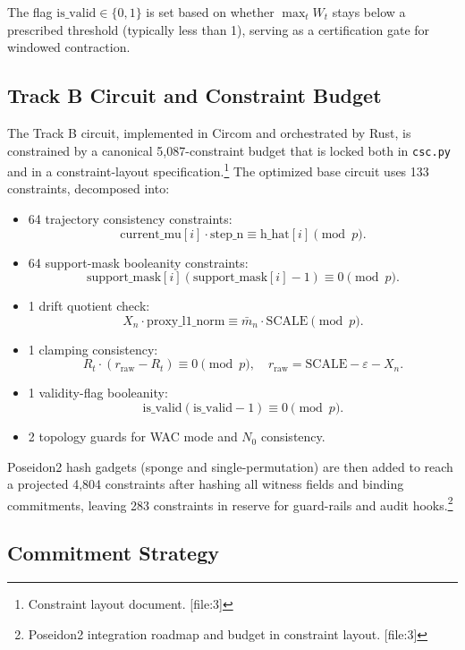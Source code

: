 \documentclass[11pt]{article}
\begin{document}
The flag \(\mathrm{is\_valid}\in\{0,1\}\) is set based on whether \(\max_t W_t\) stays below a prescribed threshold (typically less than 1), serving as a certification gate for windowed contraction.

\subsection{Track B Circuit and Constraint Budget}

The Track B circuit, implemented in Circom and orchestrated by Rust, is constrained by a canonical 5{,}087-constraint budget that is locked both in \texttt{csc.py} and in a constraint-layout specification.\footnote{Constraint layout document. [file:3]} The optimized base circuit uses 133 constraints, decomposed into:
\begin{itemize}[leftmargin=*]
  \item 64 trajectory consistency constraints:
  \[
  \mathrm{current\_mu}[i] \cdot \mathrm{step\_n} \equiv \mathrm{h\_hat}[i] \pmod p.
  \]
  \item 64 support-mask booleanity constraints:
  \[
  \mathrm{support\_mask}[i](\mathrm{support\_mask}[i]-1) \equiv 0 \pmod p.
  \]
  \item 1 drift quotient check:
  \[
  X_n \cdot \mathrm{proxy\_l1\_norm} \equiv \bar m_n\cdot \mathrm{SCALE} \pmod p.
  \]
  \item 1 clamping consistency:
  \[
  R_t \cdot (r_{\mathrm{raw}} - R_t) \equiv 0 \pmod p,
  \quad r_{\mathrm{raw}} = \mathrm{SCALE}-\varepsilon-X_n.
  \]
  \item 1 validity-flag booleanity:
  \[
  \mathrm{is\_valid}(\mathrm{is\_valid}-1) \equiv 0 \pmod p.
  \]
  \item 2 topology guards for WAC mode and \(N_0\) consistency.
\end{itemize}

Poseidon2 hash gadgets (sponge and single-permutation) are then added to reach a projected 4{,}804 constraints after hashing all witness fields and binding commitments, leaving 283 constraints in reserve for guard-rails and audit hooks.\footnote{Poseidon2 integration roadmap and budget in constraint layout. [file:3]}

\subsection{Commitment Strategy}
\end{document}
